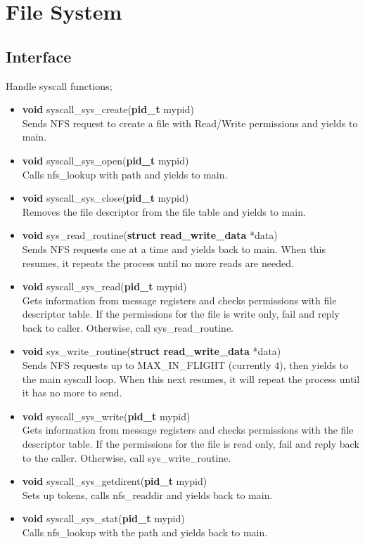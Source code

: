 \documentclass[12pt]{article}
\begin{document}
\clearpage
\section{File System}
\subsection{Interface}
Handle syscall functions;
\begin{itemize}
\item \textbf{void} syscall\_sys\_create(\textbf{pid\_t} mypid)\\
Sends NFS request to create a file with Read/Write permissions and yields to main.
\item \textbf{void} syscall\_sys\_open(\textbf{pid\_t} mypid)\\
Calls nfs\_lookup with path and yields to main.
\item \textbf{void} syscall\_sys\_close(\textbf{pid\_t} mypid)\\
Removes the file descriptor from the file table and yields to main.
\item \textbf{void} sys\_read\_routine(\textbf{struct read\_write\_data} *data)\\
Sends NFS requests one at a time and yields back to main. When this resumes, it repeats the process until no more reads are needed.
\item \textbf{void} syscall\_sys\_read(\textbf{pid\_t} mypid)\\
Gets information from message registers and checks permissions with file descriptor table. If the permissions for the file is write only, fail and reply back to caller. Otherwise, call sys\_read\_routine.
\item \textbf{void} sys\_write\_routine(\textbf{struct read\_write\_data} *data)\\
Sends NFS requests up to MAX\_IN\_FLIGHT (currently 4), then yields to the main syscall loop. When this next resumes, it will repeat the process until it has no more to send.
\item \textbf{void} syscall\_sys\_write(\textbf{pid\_t} mypid)\\
Gets information from message registers and checks permissions with the file descriptor table. If the permissions for the file is read only, fail and reply back to the caller. Otherwise, call sys\_write\_routine.
\item \textbf{void} syscall\_sys\_getdirent(\textbf{pid\_t} mypid)\\
Sets up tokens, calls nfs\_readdir and yields back to main.
\item \textbf{void} syscall\_sys\_stat(\textbf{pid\_t} mypid)\\
Calls nfs\_lookup with the path and yields back to main.
\end{itemize}
\end{document}
